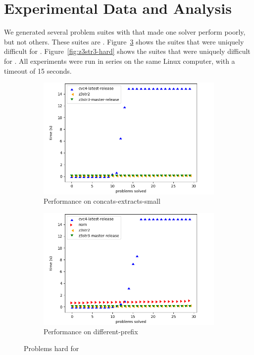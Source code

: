 \section{Experimental Data and Analysis}
\label{sec:data}

We generated several problem suites with \fuzzer{} that made one
solver perform poorly, but not others. These suites are
\theSuites{}. Figure~\ref{fig:cvc-hard} shows the suites that were
uniquely difficult for \cvc{}. Figure~\ref{fig:z3str3-hard} shows the
suites that were uniquely difficult for \us{}. All experiments were
run in series on the same Linux computer, with a timeout of 15
seconds. 

\begin{figure}[h]
    \begin{subfigure}{.5\textwidth}
        \includegraphics[width=\textwidth]{data/graphs/concats-extracts-small.png}
        \caption{Performance on concats-extracts-small}
        \label{fig:concats-extracts-small}
    \end{subfigure}
    \begin{subfigure}{.5\textwidth}
        \includegraphics[width=\textwidth]{data/graphs/different-prefix.png}
        \caption{Performance on different-prefix}
        \label{fig:different-prefix}
    \end{subfigure}
    \caption{Problems hard for \cvc{}}
    \label{fig:cvc-hard}


\end{figure}
